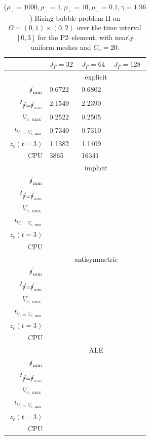 \begin{table}
\center
\hspace*{-3.25cm}
\begin{tabular}{rlll}
\hline
 & $J_\Gamma=32$ & $J_\Gamma=64$ & $J_\Gamma=128$ \\
\hline
& \multicolumn{3}{c}{explicit} \\
\cmidrule{2-4}
$\mbox{$s\!\!\!\!\:/$}_{\min}$                & 0.6722 & 0.6802 & \\
$t_{\strikes = \strikes_{\min}}$ & 2.1540 & 2.2390 & \\
$V_{c,\max}$                     & 0.2522 & 0.2505 & \\
$t_{V_c = V_{c,\max}}$           & 0.7340 & 0.7310 & \\
$z_c(t=3)$                       & 1.1382 & 1.1409 & \\
CPU                              &   3865 &  16341 & \\
\cmidrule{2-4}
& \multicolumn{3}{c}{implicit} \\
\cmidrule{2-4}
$\mbox{$s\!\!\!\!\:/$}_{\min}$                & & & \\
$t_{\strikes = \strikes_{\min}}$ & & & \\
$V_{c,\max}$                     & & & \\
$t_{V_c = V_{c,\max}}$           & & & \\
$z_c(t=3)$                       & & & \\
CPU                              & & & \\
\cmidrule{2-4}
& \multicolumn{3}{c}{antisymmetric} \\
\cmidrule{2-4}
$\mbox{$s\!\!\!\!\:/$}_{\min}$                & & & \\
$t_{\strikes = \strikes_{\min}}$ & & & \\
$V_{c,\max}$                     & & & \\
$t_{V_c = V_{c,\max}}$           & & & \\
$z_c(t=3)$                       & & & \\
CPU                              & & & \\
\cmidrule{2-4}
& \multicolumn{3}{c}{ALE} \\
\cmidrule{2-4}
$\mbox{$s\!\!\!\!\:/$}_{\min}$                & & & \\
$t_{\strikes = \strikes_{\min}}$ & & & \\
$V_{c,\max}$                     & & & \\
$t_{V_c = V_{c,\max}}$           & & & \\
$z_c(t=3)$                       & & & \\
CPU                              & & & \\
\hline
\end{tabular}
\hspace*{-3.25cm}
\caption[Navier--Stokes 2d rising bubble II benchmark values P2--\pdg]
{($\rho_+ = 1000,\rho_- = 1,\mu_+ = 10,\mu_- =0.1,\gamma = 1.96$)
Rising bubble problem II on ${\Omega = (0,1) \times (0,2)}$ over the time
interval $[0,3]$ for the P2--\pdg element, with nearly uniform meshes and
$C_a=20$\textdegree.}
\label{tab:risingbubble2DIIp2p1dg}
\end{table}